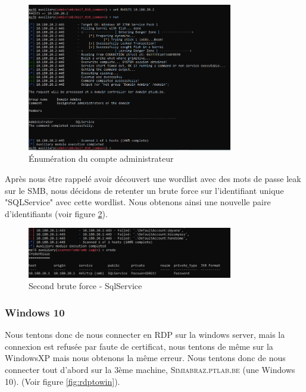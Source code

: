 \documentclass[a4paper]{article}
\begin{document}
\begin{figure}[H]
    \centering
    \includegraphics[width=0.8\textwidth]{images/lab4/MS17_010.PNG}
    \caption{Énumération du compte administrateur}
    \label{fig:enumadmin}
\end{figure}

Après nous être rappelé avoir découvert une wordlist avec des mots de passe leak sur le SMB, nous décidons de retenter un brute force sur l'identifiant unique "SQLService" avec cette wordlist. Nous obtenons ainsi une nouvelle paire d'identifiants (voir figure \ref{fig:secondbrute}).

\begin{figure}[H]
    \centering
    \includegraphics[width=0.8\textwidth]{images/lab4/secondbruteforce.PNG}
    \caption{Second brute force - SqlService}
    \label{fig:secondbrute}
\end{figure}

\subsubsection{Windows 10}

Nous tentons donc de nous connecter en RDP sur la windows server, mais la connexion est refusée par faute de certificat, nous tentons de même sur la WindowsXP mais nous obtenons la même erreur. Nous tentons donc de nous connecter tout d'abord sur la 3ème machine, \textsc{Simiabraz.ptlab.be} (une Windows 10). (Voir figure \ref{fig:rdptowin}).
\end{document}
